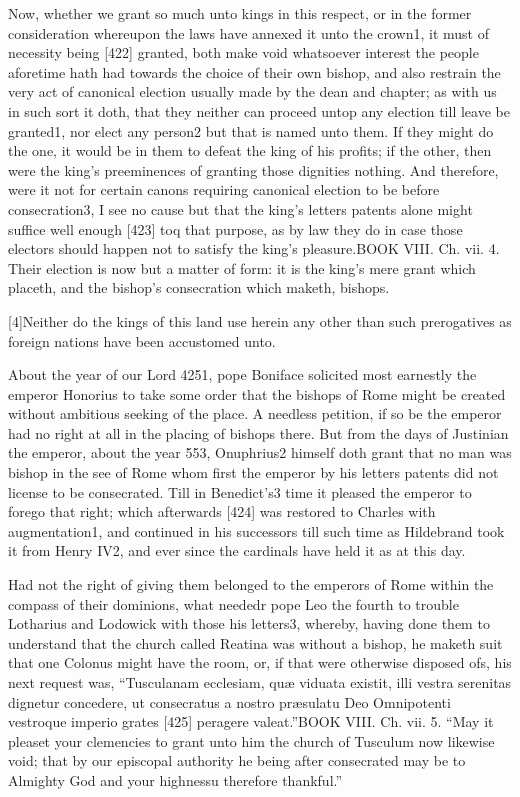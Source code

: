 Now, whether we grant so much unto kings in this respect, or in the former consideration whereupon the laws have annexed it unto the crown1, it must of necessity being [422] granted, both make void whatsoever interest the people aforetime hath had towards the choice of their own bishop, and also restrain the very act of canonical election usually made by the dean and chapter; as with us in such sort it doth, that they neither can proceed untop any election till leave be granted1, nor elect any person2 but that is named unto them. If they might do the one, it would be in them to defeat the king of his profits; if the other, then were the king’s preeminences of granting those dignities nothing. And therefore, were it not for certain canons requiring canonical election to be before consecration3, I see no cause but that the king’s letters patents alone might suffice well enough [423] toq that purpose, as by law they do in case those electors should happen not to satisfy the king’s pleasure.BOOK VIII. Ch. vii. 4. Their election is now but a matter of form: it is the king’s mere grant which placeth, and the bishop’s consecration which maketh, bishops.

[4]Neither do the kings of this land use herein any other than such prerogatives as foreign nations have been accustomed unto.

About the year of our Lord 4251, pope Boniface solicited most earnestly the emperor Honorius to take some order that the bishops of Rome might be created without ambitious seeking of the place. A needless petition, if so be the emperor had no right at all in the placing of bishops there. But from the days of Justinian the emperor, about the year 553, Onuphrius2 himself doth grant that no man was bishop in the see of Rome whom first the emperor by his letters patents did not license to be consecrated. Till in Benedict’s3 time it pleased the emperor to forego that right; which afterwards [424] was restored to Charles with augmentation1, and continued in his successors till such time as Hildebrand took it from Henry IV2, and ever since the cardinals have held it as at this day.

Had not the right of giving them belonged to the emperors of Rome within the compass of their dominions, what neededr pope Leo the fourth to trouble Lotharius and Lodowick with those his letters3, whereby, having done them to understand that the church called Reatina was without a bishop, he maketh suit that one Colonus might have the room, or, if that were otherwise disposed ofs, his next request was, “Tusculanam ecclesiam, quæ viduata existit, illi vestra serenitas dignetur concedere, ut consecratus a nostro præsulatu Deo Omnipotenti vestroque imperio grates [425] peragere valeat.”BOOK VIII. Ch. vii. 5. “May it pleaset your clemencies to grant unto him the church of Tusculum now likewise void; that by our episcopal authority he being after consecrated may be to Almighty God and your highnessu therefore thankful.”

